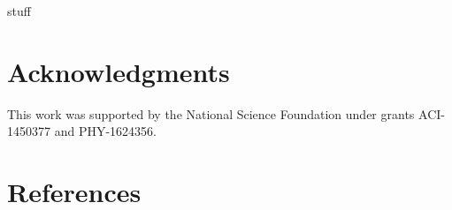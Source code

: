 \documentclass[a4paper]{jpconf}
\begin{document}
stuff\cite{2019EPJWC}

\section{Acknowledgments}

This work was supported by the National Science Foundation under grants ACI-1450377 and PHY-1624356.

\section*{References}
{}

\end{document}
